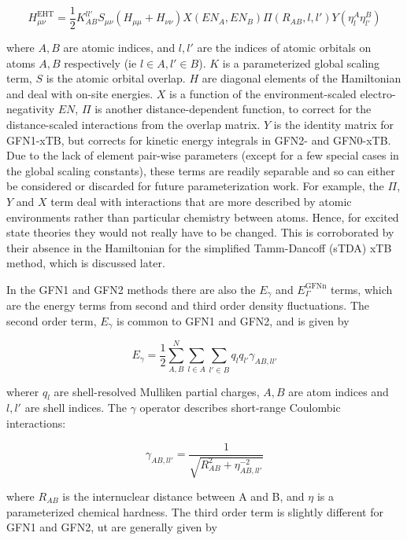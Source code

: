 \begin{equation}
H_{\mu\nu}^{\text{EHT}} = \frac{1}{2} K_{AB}^{ll'}S_{\mu\nu}\left(H_{\mu\mu} + H_{\nu\nu}\right)X\left(EN_A, EN_B\right)\Pi\left(R_{AB}, l, l'\right)Y\left(\eta^A_l\eta^B_{l'}\right)
\end{equation}

where $A,B$ are atomic indices, and $l,l'$ are the indices of atomic orbitals on 
atoms $A, B$ respectively (ie $l \in A, l' \in B$). $K$ is a parameterized global 
scaling term, $S$ is the atomic orbital overlap. $H$ are diagonal elements of the 
Hamiltonian and deal with on-site energies. $X$ is a function of the environment-scaled 
electro-negativity $EN$, $\Pi$ is another distance-dependent function, to correct 
for the distance-scaled interactions from the overlap matrix. $Y$ is the identity 
matrix for GFN1-xTB, but corrects for kinetic energy integrals in GFN2- and GFN0-xTB. 
Due to the lack of element pair-wise parameters (except for a few special cases 
in the global scaling constants), these terms are readily separable and so can either 
be considered or discarded for future parameterization work. For example, the $\Pi$,
$Y$ and $X$ term deal with interactions that are more described by atomic environments 
rather than particular chemistry between atoms. Hence, for excited state theories they 
would not really have to be changed. This is corroborated by their absence in the 
Hamiltonian for the simplified Tamm-Dancoff (sTDA) xTB\cite{Grimme2016} method, 
which is discussed later.

In the GFN1 and GFN2 methods there are also the $E_\gamma$ and $E_\Gamma^{\text{GFNn}}$ 
terms, which are the energy terms from second and third order density fluctuations. 
The second order term, $E_\gamma$ is common to GFN1 and GFN2, and is given by

\begin{equation}
E_\gamma = \frac{1}{2} \sum^{N}_{A,B} \sum_{l \in A} \sum_{l' \in B} q_l q_{l'} \gamma_{AB, ll'}
\end{equation}

wherer $q_l$ are shell-resolved Mulliken partial charges, $A,B$ are atom indices 
and $l,l'$ are shell indices. The $\gamma$ operator describes short-range Coulombic 
interactions:

\begin{equation}
\gamma_{AB, ll'} = \frac{1}{\sqrt{R^2_{AB} + \eta^{-2}_{AB, ll'}}}
\end{equation}

where $R_{AB}$ is the internuclear distance between A and B, and $\eta$ is a parameterized 
chemical hardness. The third order term is slightly different for GFN1 and GFN2,
 ut are generally given by


